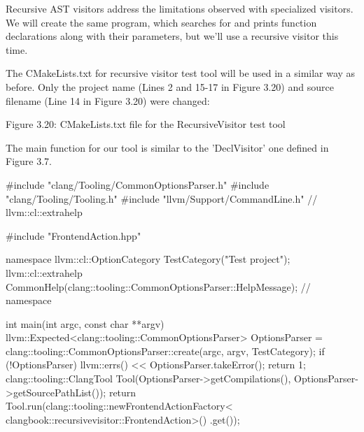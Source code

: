 Recursive AST visitors address the limitations observed with specialized visitors. We will create the same program, which searches for and prints function declarations along with their parameters, but we'll use a recursive visitor this time.

The CMakeLists.txt for recursive visitor test tool will be used in a similar way as before. Only the project name (Lines 2 and 15-17 in Figure 3.20) and source filename (Line 14 in Figure 3.20) were changed:


\begin{center}
Figure 3.20: CMakeLists.txt file for the RecursiveVisitor test tool
\end{center}

The main function for our tool is similar to the 'DeclVisitor' one defined in Figure 3.7.

\begin{cpp}
#include "clang/Tooling/CommonOptionsParser.h"
#include "clang/Tooling/Tooling.h"
#include "llvm/Support/CommandLine.h" // llvm::cl::extrahelp

#include "FrontendAction.hpp"

namespace {
llvm::cl::OptionCategory TestCategory("Test project");
llvm::cl::extrahelp
  CommonHelp(clang::tooling::CommonOptionsParser::HelpMessage);
} // namespace

int main(int argc, const char **argv) {
  llvm::Expected<clang::tooling::CommonOptionsParser> OptionsParser =
    clang::tooling::CommonOptionsParser::create(argc, argv, TestCategory);
  if (!OptionsParser) {
    llvm::errs() << OptionsParser.takeError();
    return 1;
  }
  clang::tooling::ClangTool Tool(OptionsParser->getCompilations(),
                                 OptionsParser->getSourcePathList());
  return Tool.run(clang::tooling::newFrontendActionFactory<
                    clangbook::recursivevisitor::FrontendAction>()
                    .get());
}
\end{cpp}


